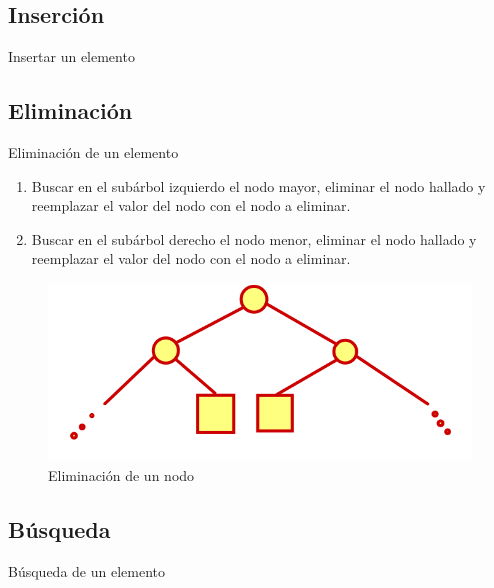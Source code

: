 \documentclass[11pt]{beamer}
\begin{document}
	\subsection{Inserción}
		\begin{frame}{Insertar un elemento}
		\justifying
		
		
		
	\end{frame}
		
	\subsection{Eliminación}
		\begin{frame}{Eliminación de un elemento}
			\justifying
			\begin{enumerate}
                \item Buscar en el subárbol izquierdo el nodo mayor, eliminar el nodo hallado y reemplazar el valor del nodo con el nodo a eliminar.
                \item Buscar en el subárbol derecho el nodo menor, eliminar el nodo hallado y reemplazar el valor del nodo con el nodo a eliminar.
            \end{enumerate}
			\begin{figure}[H]
				\centering
				\includegraphics[scale=0.40]{img/eliminar.png}
				\caption{Eliminación de un nodo}
				\label{fig:eliminar}
			\end{figure}
			
		\end{frame}
	
	\subsection{Búsqueda}
		\begin{frame}{Búsqueda de un elemento}
			\justifying
			
		\end{frame}
		
\end{document}
